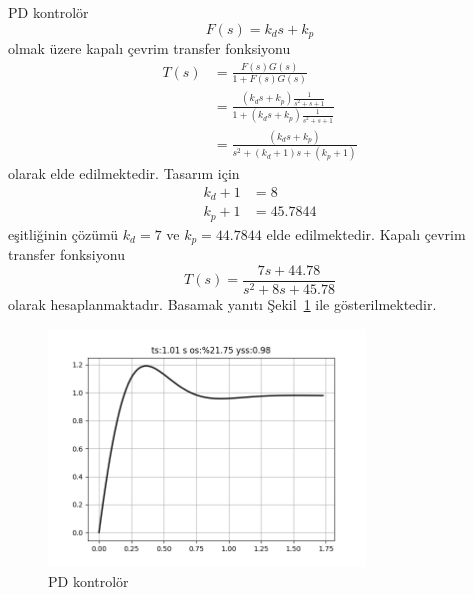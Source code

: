 PD kontrolör
\begin{equation}
    F(s)=k_d s+k_p
\end{equation}
olmak üzere kapalı çevrim transfer fonksiyonu 
\begin{equation}
\begin{split}
    T(s)&=\frac{F(s)G(s)}{1+F(s)G(s)}\\
    &=\frac{(k_d s+k_p)\frac{1}{s^2+s+1}}{1+(k_d s+k_p)\frac{1}{s^2+s+1}}\\
    &=\frac{(k_d s+k_p)}{s^2+(k_d+1)s+(k_p+1)}
\end{split}
\end{equation}
olarak elde edilmektedir. Tasarım için 
\begin{equation}
\begin{split}
    k_d+1&=8\\
    k_p+1&=45.7844
\end{split}
\end{equation}
eşitliğinin çözümü $k_d=7$ ve $k_p=44.7844$ elde edilmektedir. Kapalı çevrim transfer fonksiyonu
\begin{equation}
    T(s)=\frac{7 s + 44.78}{s^2 + 8 s + 45.78}
\end{equation}
olarak hesaplanmaktadır. Basamak yanıtı Şekil~\ref{fig:pd_kontrol} ile gösterilmektedir.
\begin{figure}[!htb]
    \centering
    \includegraphics[width=0.75\textwidth]{pd_kontrol}
    \caption{PD kontrolör}
    \label{fig:pd_kontrol}
\end{figure}